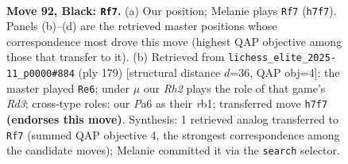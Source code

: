 \documentclass[11pt]{article}
\begin{document}
\begin{figure}[p]\centering
\begin{subfigure}{0.46\textwidth}\centering
\resizebox{\linewidth}{!}{%
\newchessgame
\chessboard[
  setfen={8/4k2r/p7/P1p2p1p/1pp2P1P/4P1P1/1P4K1/2R5 b - - 5 92},
  showmover=false,
  pgfstyle=straightmove, color=movearrow, markmove={h7-f7}
]}
\caption{}
\end{subfigure}\hfill
\begin{subfigure}{0.46\textwidth}\centering
\resizebox{\linewidth}{!}{%
\newchessgame
\chessboard[
  setfen={8/1p6/p1pr1kp1/P6p/1PK2P1P/4P3/8/1R6 b - - 16 90},
  showmover=false,
  pgfstyle=straightmove, color=movearrow, markmove={d6-e6}
]}
\caption{}
\end{subfigure}
\\[4pt]

\caption{\textbf{Move 92, Black: \texttt{Rf7}.} (a) Our position; Melanie plays \texttt{Rf7} (\texttt{h7f7}). Panels (b)--(d) are the retrieved master positions whose correspondence most drove this move (highest QAP objective among those that transfer to it). (b) Retrieved from \texttt{lichess\_elite\_2025-11\_p0000\#884} (ply 179) [structural distance $d$=36, QAP obj=4]: the master played \texttt{Re6}; under $\mu$ our \emph{Rh2} plays the role of that game's \emph{Rd3}; cross-type roles: our \emph{P}a6 as their \emph{r}b1; transferred move \texttt{h7f7} \textbf{(endorses this move)}. Synthesis: 1 retrieved analog transferred to \texttt{Rf7} (summed QAP objective 4, the strongest correspondence among the candidate moves); Melanie committed it via the \texttt{search} selector.}
\label{fig:thought-m183}
\end{figure}

\clearpage
\end{document}
